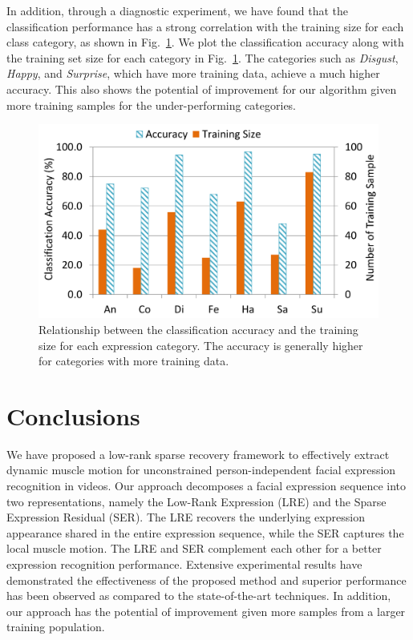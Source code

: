 \documentclass[journal]{IEEEtran}
\begin{document}
In addition, through a diagnostic experiment, we have found that the classification performance has a strong correlation with the training size for each class category, as shown in Fig.~\ref{fig:fig_ck_size}. We plot the classification accuracy along with the training set size for each category in Fig.~\ref{fig:fig_ck_size}. The categories such as \textit{Disgust}, \textit{Happy}, and \textit{Surprise}, which have more training data, achieve a much higher accuracy. This also shows the potential of improvement for our algorithm given more training samples for the under-performing categories. 


\begin{figure}[htbp]
	\centering
		\includegraphics[width=.8\columnwidth]{pics/fig_ck_size.png}
	\caption{Relationship between the classification accuracy and the training size for each expression category. The accuracy is generally higher for categories with more training data.}
	\label{fig:fig_ck_size}
\end{figure}



\section{Conclusions\label{sec:conclude}}
We have proposed a low-rank sparse recovery framework to effectively extract dynamic muscle motion for unconstrained person-independent facial expression recognition in videos. Our approach decomposes a facial expression sequence into two representations, namely the Low-Rank Expression (LRE) and the Sparse Expression Residual (SER). The LRE recovers the underlying expression appearance shared in the entire expression sequence, while the SER captures the local muscle motion. The LRE and SER complement each other for a better expression recognition performance. Extensive experimental results have demonstrated the effectiveness of the proposed method and superior performance has been observed as compared to the state-of-the-art techniques. In addition, our approach has the potential of improvement given more samples from a larger training population. 
\end{document}
